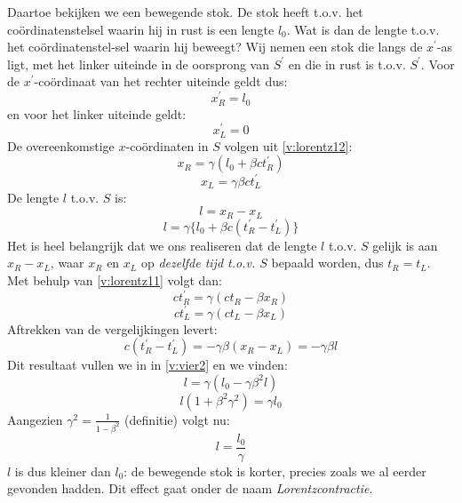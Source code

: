 Daartoe bekijken we een bewegende stok. De stok
heeft t.o.v. het co\"{o}rdinatenstelsel waarin hij in rust is een
lengte $l_{0}$.  Wat is dan de lengte t.o.v. het
co\"{o}rdinatenstel-sel waarin hij beweegt?  Wij nemen een stok die
langs de $x^{'}$-as ligt, met het linker uiteinde in de oorsprong van
$S^{'}$ en die in rust is t.o.v. $S^{'}$.  Voor de
$x^{'}$-co\"{o}rdinaat van het rechter uiteinde geldt dus:
\begin{displaymath}
x^{'}_{R} = l_{0}
\end{displaymath}
en voor het linker uiteinde geldt:
\begin{displaymath}
x^{'}_{L} = 0
\end{displaymath}
De overeenkomstige $x$-co\"{o}rdinaten in $S$ volgen uit \ref{v:lorentz12}:
\begin{displaymath}
x_{R} = \gamma (l_{0} + \beta ct^{'}_{R})
\end{displaymath}
\begin{displaymath}
x_{L} = \gamma \beta ct^{'}_{L}
\end{displaymath}
De lengte $l$ t.o.v. $S$ is:
\begin{displaymath}
l = x_{R} - x_{L}
\end{displaymath}
\begin{equation}
\label{v:vier2}
l = \gamma \{l_{0} + \beta c(t^{'}_{R} - t^{'}_{L})\}
\end{equation}
Het is heel belangrijk dat we ons realiseren dat de lengte $l$ t.o.v. $S$ 
gelijk is aan $x_{R} - x_{L}$, waar $x_{R}$ en $x_{L}$ op 
{\sl dezelfde tijd t.o.v. $S$} bepaald worden, 
dus $t_{R} = t_{L}$.
Met behulp van \ref{v:lorentz11} volgt dan:
\begin{displaymath}
ct^{'}_{R} = \gamma (ct_{R} - \beta x_{R})
\end{displaymath}
\begin{displaymath}
ct^{'}_{L} = \gamma (ct_{L} - \beta x_{L}) 
\end{displaymath}
Aftrekken van de vergelijkingen levert:
\begin{displaymath}
c(t^{'}_{R} - t^{'}_{L}) = -\gamma \beta (x_{R} - x_{L}) = -\gamma \beta l
\end{displaymath}
Dit resultaat vullen we in in \ref{v:vier2} en we vinden:
\begin{displaymath}
l = \gamma (l_{0} - \gamma \beta ^{2} l)
\end{displaymath}
\begin{displaymath}
l (1 + \beta ^{2} \gamma ^{2}) = \gamma l_{0}
\end{displaymath}
Aangezien $\gamma ^{2} = \frac{1}{1 - \beta ^{2}}$ (definitie) volgt nu:
\begin{equation}
\label{v:vier3}
l = \frac{l_{0}}{\gamma}
\end{equation}
$l$ is dus kleiner dan $l_{0}$: de bewegende stok is korter, precies
zoals we al eerder gevonden hadden. Dit effect gaat onder de naam {\sl
Lorentzcontractie}.

